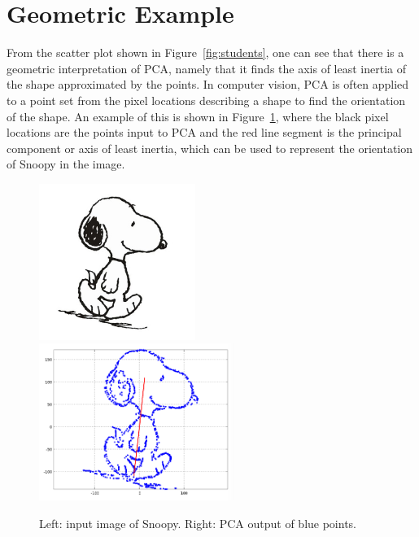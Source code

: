 \documentclass{article}
\begin{document}
\section{Geometric Example}

From the scatter plot shown in Figure~\ref{fig:students}, one can see that there is a geometric interpretation of PCA, namely that it finds the axis of least inertia of the shape approximated by the points.  In computer vision, PCA is often applied to a point set from the pixel locations describing a shape to find the orientation of the shape.  An example of this is shown in Figure~\ref{fig:snoopy}, where the black pixel locations are the points input to PCA and the red line segment is the principal component or axis of least inertia, which can be used to represent the orientation of Snoopy in the image.

\begin{figure}
\centering
\includegraphics[width=2in]{Snoopy.png} \includegraphics[width=2.5in]{snoopyPCA.png}
\caption{Left: input image of Snoopy.  Right: PCA output of blue points.}
\label{fig:snoopy}
\end{figure}
\end{document}
